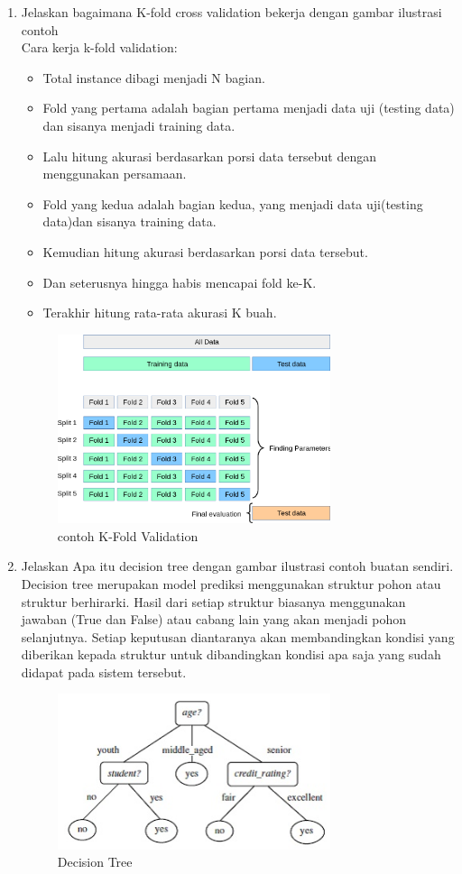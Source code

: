 \begin{enumerate}
\item Jelaskan bagaimana K-fold cross validation bekerja dengan gambar ilustrasi contoh
	\hfill\\
Cara kerja k-fold validation:
\begin{itemize}
	\item Total instance dibagi menjadi N bagian.
	\item Fold yang pertama adalah bagian pertama menjadi data uji (testing data) dan sisanya menjadi training data.
	\item Lalu hitung akurasi berdasarkan porsi data tersebut dengan menggunakan persamaan.
	\item Fold yang kedua adalah bagian kedua, yang menjadi data uji(testing data)dan sisanya training  data.
	\item Kemudian hitung akurasi berdasarkan porsi data tersebut.
	\item Dan seterusnya hingga habis mencapai fold ke-K.
	\item Terakhir hitung rata-rata akurasi K buah.
\end{itemize}
\begin{figure}[H]
    \includegraphics[width=8cm]{figures/1174084/2/7.png}
    \centering
    \caption{contoh K-Fold Validation}
\end{figure}

\item Jelaskan Apa itu decision tree dengan gambar ilustrasi contoh buatan sendiri.
	\hfill\\
	Decision tree merupakan model prediksi menggunakan struktur pohon atau struktur berhirarki. Hasil dari setiap struktur biasanya menggunakan jawaban (True dan False) atau cabang lain yang akan menjadi pohon selanjutnya. Setiap keputusan diantaranya akan membandingkan kondisi yang diberikan kepada struktur untuk dibandingkan kondisi apa saja yang sudah didapat pada sistem tersebut.
\begin{figure}[H]
    \includegraphics[width=8cm]{figures/1174084/2/8.png}
    \centering
    \caption{Decision Tree}
\end{figure}



\end{enumerate}
